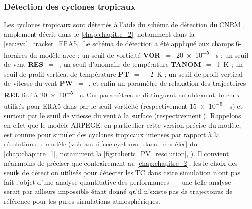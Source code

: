 \documentclass[../main.tex]{subfiles}
\begin{document}
\subsubsection{Détection des cyclones tropicaux}

Les cyclones tropicaux sont détectés à l'aide du schéma de détection du CNRM \parencite{chauvin_response_2006}, amplement décrit dans le \cref{chap:chapitre_2},
notamment dans la \cref{sec:eval_tracker_ERA5}. Le schéma de détection a été appliqué aux champs 6-horaires du modèle avec : un seuil de vorticité
\textbf{VOR}~$=$~\SI{20e-5}{\per\second} ; un seuil de vent \textbf{RES}~$=$~, un seuil d'anomalie de température \textbf{TANOM}~$=$~\SI{1}{\kelvin} ; un
seuil de profil vertical de température \textbf{PT}~$=$~\SI{-2}{\kelvin} ; un seuil de profil vertical de vitesse du vent \textbf{PW}~$=$~, et enfin un
paramètre de relaxation des trajectoires \textbf{REL} fixé à \SI{20e-5}{\per\second}. Ces paramètres se distinguent notablement de ceux utilisés pour ERA5 dans
\textcite{dulac_assessing_2023} par le seuil vorticité (respectivement \SI{15e-5}{\per\second}) et surtout par le seuil de vitesse du vent à la surface
(respectivement ). Rappelons en effet que le modèle ARPEGE, en particulier cette version précise du modèle, est connue pour simuler des cyclones tropicaux
intenses par rapport à la résolution du modèle \parencite{roberts_impact_2020,chauvin_future_2020} (voir aussi \cref{sec:cyclones_dans_modèles} du
\cref{chap:chapitre_1}, notamment la \cref{fig:roberts_PV_resolution}, ). Il convient néanmoins de préciser que
contrairement au \cref{chap:chapitre_2}, les le choix des seuils de détection utilisés pour détecter les TC dans cette simulation n'ont pas fait l'objet d'une
analyse quantitative des performances ---~une telle analyse serait par ailleurs impossible étant donné qu'il n'existe pas de trajectoires de référence pour les
pures simulations atmosphériques.
\end{document}
